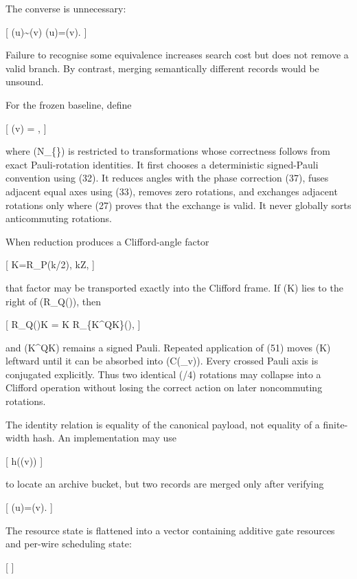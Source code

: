\documentclass[
]{article}
\begin{document}
The converse is unnecessary:

{[} (u)\sim{}(v) \nRightarrow
\kappa(u)=\kappa(v).  {]}

Failure to recognise some equivalence increases search cost but does not
remove a valid branch. By contrast, merging semantically different
records would be unsound.

For the frozen baseline, define

{[} \kappa(v) =  ,  {]}

where (\mathcal N\_\{\}) is restricted to transformations
whose correctness follows from exact Pauli-rotation identities. It first
chooses a deterministic signed-Pauli convention using (32). It reduces
angles with the phase correction (37), fuses adjacent equal axes using
(33), removes zero rotations, and exchanges adjacent rotations only
where (27) proves that the exchange is valid. It never globally sorts
anticommuting rotations.

When reduction produces a Clifford-angle factor

{[} K=R\_P(k\pi/2), \qquad k\in\mathbb Z,  {]}

that factor may be transported exactly into the Clifford frame. If (K)
lies to the right of (R\_Q(\theta)), then

{[} R\_Q(\theta)K = K R\_\{K\^{}\dagger QK\}(\theta),  {]}

and (K\^{}\dagger QK) remains a signed Pauli. Repeated application of
(51) moves (K) leftward until it can be absorbed into (C(\Theta\_v)).
Every crossed Pauli axis is conjugated explicitly. Thus two identical
(\pi/4) rotations may collapse into a Clifford operation without losing
the correct action on later noncommuting rotations.

The identity relation is equality of the canonical payload, not equality
of a finite-width hash. An implementation may use

{[} h(\kappa(v))  {]}

to locate an archive bucket, but two records are merged only after
verifying

{[} \kappa(u)=\kappa(v).  {]}

The resource state is flattened into a vector containing additive gate
resources and per-wire scheduling state:

{[}   {]}
\end{document}
